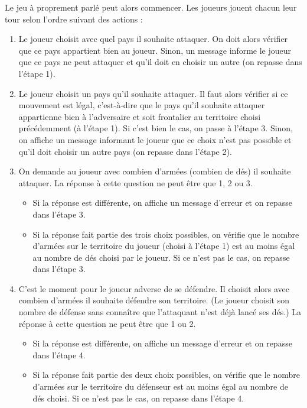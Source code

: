 \vspace{0.3cm}
Le jeu à proprement parlé peut alors commencer. Les joueurs jouent chacun leur tour selon l'ordre suivant des actions :
\begin{enumerate}
    \item Le joueur choisit avec quel pays il souhaite attaquer. On doit alors vérifier que ce pays appartient bien au joueur. Sinon, un message informe le joueur que ce pays ne peut attaquer et qu'il doit en choisir un autre (on repasse dans l'étape 1).
    
    \item Le joueur choisit un pays qu'il souhaite attaquer. Il faut alors vérifier si ce mouvement est légal, c'est-à-dire que le pays qu'il souhaite attaquer appartienne bien à l'adversaire et soit frontalier au territoire choisi précédemment (à l'étape 1). Si c'est bien le cas, on passe à l'étape 3. Sinon, on affiche un message informant le joueur que ce choix n'est pas possible et qu'il doit choisir un autre pays (on repasse dans l'étape 2).
    
    \item On demande au joueur avec combien d'armées (combien de dés) il souhaite attaquer. La réponse à cette question ne peut être que 1, 2 ou 3.
    \begin{itemize}
        \item Si la réponse est différente, on affiche un message d'erreur et on repasse dans l'étape 3.
        \item Si la réponse fait partie des trois choix possibles, on vérifie que le nombre d'armées sur le territoire du joueur (choisi à l'étape 1) est au moins égal au nombre de dés choisi par le joueur. Si ce n'est pas le cas, on repasse dans l'étape 3.
    \end{itemize}
    
    \item C'est le moment pour le joueur adverse de se défendre. Il choisit alors avec combien d'armées il souhaite défendre son territoire. (Le joueur choisit son nombre de défense sans connaître que l'attaquant n'est déjà lancé ses dés.) La réponse à cette question ne peut être que 1 ou 2. 
    \begin{itemize}
        \item Si la réponse est différente, on affiche un message d'erreur et on repasse dans l'étape 4.
        \item Si la réponse fait partie des deux choix possibles, on vérifie que le nombre d'armées sur le territoire du défenseur est au moins égal au nombre de dés choisi. Si ce n'est pas le cas, on repasse dans l'étape 4.
    \end{itemize}
    

\end{enumerate}
